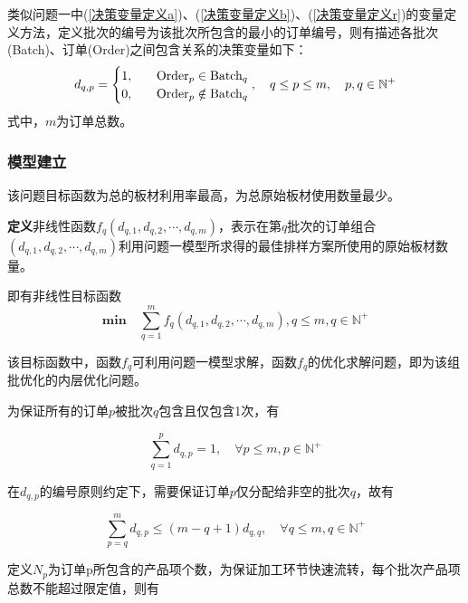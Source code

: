 \documentclass[bwprint]{gmcmthesis}
\begin{document}
类似问题一中(\ref{决策变量定义a})、(\ref{决策变量定义b})、(\ref{决策变量定义r})的变量定义方法，定义批次的编号为该批次所包含的最小的订单编号，则有描述各批次(Batch)、订单(Order)之间包含关系的决策变量如下：
\begin{equation}   %
    d_{q,p}=
    \begin{cases}
        1, \quad  & \text{Order}_p \in  \text{Batch}_q \\
        0,\quad  & \text{Order}_p \notin  \text{Batch}_q \\
    \end{cases},\quad q\le p \le m,\quad p,q \in  \mathbb{N}^+\\
\end{equation}
\noindent 式中，$m$为订单总数。


\subsubsection{模型建立}
该问题目标函数为总的板材利用率最高，为总原始板材使用数量最少。

\textbf{定义}非线性函数$f_q(d_{q,1},d_{q,2},\cdots,d_{q,m})$，表示在第$q$批次的订单组合$(d_{q,1},d_{q,2},\cdots,d_{q,m})$利用问题一模型所求得的最佳排样方案所使用的原始板材数量。

即有非线性目标函数
\begin{equation}   
    \mathbf{min}\quad\sum_{q=1}^{m} f_q(d_{q,1},d_{q,2},\cdots,d_{q,m}),q\le m ,q\in  \mathbb{N}^+\label{目标函数2}
\end{equation}

该目标函数中，函数$f_q$可利用问题一模型求解，函数$f_q$的优化求解问题，即为该组批优化的内层优化问题。

为保证所有的订单$p$被批次$q$包含且仅包含1次，有

\begin{equation}   
    \sum_{q=1}^{p} d_{q,p}=1,\quad \forall p\le m,p \in \mathbb{N}^+ \label{订单必须排} 
\end{equation}


在$d_{q,p}$的编号原则约定下，需要保证订单$p$仅分配给非空的批次$q$，故有

\begin{equation}   
\sum_{p=q}^{m} d_{q,p} \le (m-q+1)d_{q,q},\quad \forall q\le m,q\in \mathbb{N}^+\label{编号原则2}
\end{equation}

定义$N_p$为订单p所包含的产品项个数，为保证加工环节快速流转，每个批次产品项总数不能超过限定值，则有
\end{document}
